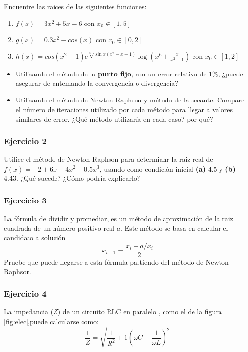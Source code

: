 \documentclass[a4paper,11pt]{article}
\theoremstyle{mytheor}
\begin{document}
Encuentre las raices de las siguientes funciones:

\begin{enumerate}	
\item $f(x) = 3x^2 + 5x -6$ con  $x_0 \in [1,5]$
\item $g(x) = 0.3x^2 -cos(x)$ con $x_0 \in [0,2]$
\item $h(x) = cos(x^2-1)e^{\sqrt[3]{\sin x  (x^2 -x +1)}}\log{(x^6+\frac{x}{x^2-1})}$ con $x_0 \in [1,2]$

\end{enumerate}

\begin{itemize}
\item Utilizando el método de la \textbf{punto fijo}, con un error relativo de $1\%$, ¿puede asegurar de antemando la convergencia o divergencia?
\item Utilizando el método de Newton-Raphson y método de la secante. Compare el número de iteraciones utilizado por cada método para llegar a valores similares de error. ¿Qué método utilizaría en cada caso? por qué?

\end{itemize}


\subsubsection*{Ejercicio 2}

Utilice el método de Newton-Raphson para determianr la raiz real de 
$f(x) = -2+6x-4x^2+0.5 x^3$, usando como condición inicial
\textbf{(a)} 4.5 y \textbf{(b)} 4.43. ¿Qué sucede? ¿Cómo podría explicarlo?

\subsubsection*{Ejercicio 3}

La fórmula de dividir y promediar, es un método de aproximación de la raiz cuadrada 
de un número positivo real $a$. Este método se basa en calcular el candidato a solución
$$ x_{i+1} = \frac{x_i+ a/x_i}{2}$$
Pruebe que puede llegarse a esta fórmula partiendo del método de Newton-Raphson.

\subsubsection*{Ejercicio 4}

La impedancia ($Z$) de un circuito RLC en paralelo , como el de la figura \ref{fig:elec},puede calcularse como:
$$\frac{1}{Z} = \sqrt{\frac{1}{R^2}+ 1(\omega C - \frac{1}{\omega L})^2}$$
\end{document}
